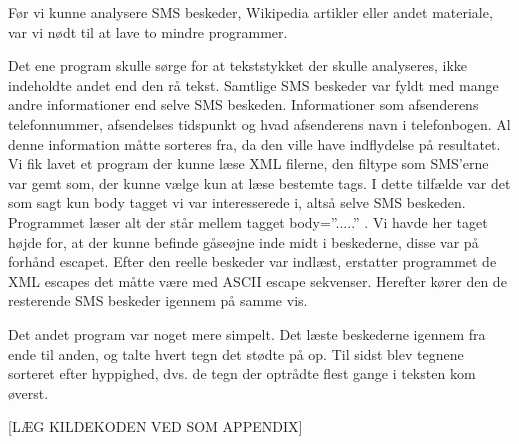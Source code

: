 \label{SmaaProg}
Før vi kunne analysere SMS beskeder, Wikipedia artikler eller andet materiale, var vi nødt til at lave to mindre programmer.

Det ene program skulle sørge for at tekststykket der skulle analyseres, ikke indeholdte andet end den rå tekst. Samtlige SMS beskeder var fyldt med mange andre informationer end selve SMS beskeden. Informationer som afsenderens telefonnummer, afsendelses tidspunkt og hvad afsenderens navn i telefonbogen. Al denne information måtte sorteres fra, da den ville have indflydelse på resultatet. Vi fik lavet et program der kunne læse XML filerne, den filtype som SMS’erne var gemt som, der kunne vælge kun at læse bestemte tags. I dette tilfælde var det som sagt kun body tagget vi var interesserede i, altså selve SMS beskeden. Programmet læser alt der står mellem tagget body=”.....” . Vi havde her taget højde for, at der kunne befinde gåseøjne inde midt i beskederne, disse var på forhånd escapet. Efter den reelle beskeder var indlæst, erstatter programmet de XML escapes det måtte være med ASCII escape sekvenser. Herefter kører den de resterende SMS beskeder igennem på samme vis.

Det andet program var noget mere simpelt. Det læste beskederne igennem fra ende til anden, og talte hvert tegn det stødte på op. Til sidst blev tegnene sorteret efter hyppighed, dvs. de tegn der optrådte flest gange i teksten kom øverst.

[LÆG KILDEKODEN VED SOM APPENDIX]
 
